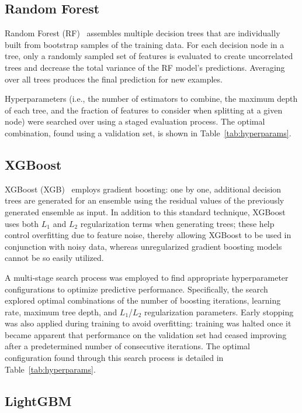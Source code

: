 \subsection{Random Forest}

Random Forest (RF)~\cite{breiman2001random} assembles multiple decision trees that are individually built from bootstrap samples of the training data. For each decision node in a tree, only a randomly sampled set of features is evaluated to create uncorrelated trees and decrease the total variance of the RF model's predictions. Averaging over all trees produces the final prediction for new examples.

Hyperparameters (i.e., the number of estimators to combine, the maximum depth of each tree, and the fraction of features to consider when splitting at a given node) were searched over using a staged evaluation process. The optimal combination, found using a validation set, is shown in Table~\ref{tab:hyperparams}.

\subsection{XGBoost}

XGBoost (XGB)~\cite{chen2016xgboost} employs gradient boosting: one by one, additional decision trees are generated for an ensemble using the residual values of the previously generated ensemble as input. In addition to this standard technique, XGBoost uses both $L_1$ and $L_2$ regularization terms when generating trees; these help control overfitting due to feature noise, thereby allowing XGBoost to be used in conjunction with noisy data, whereas unregularized gradient boosting models cannot be so easily utilized.

A multi-stage search process was employed to find appropriate hyperparameter configurations to optimize predictive performance. Specifically, the search explored optimal combinations of the number of boosting iterations, learning rate, maximum tree depth, and $L_1$/$L_2$ regularization parameters. Early stopping was also applied during training to avoid overfitting: training was halted once it became apparent that performance on the validation set had ceased improving after a predetermined number of consecutive iterations. The optimal configuration found through this search process is detailed in Table~\ref{tab:hyperparams}.

\subsection{LightGBM}

